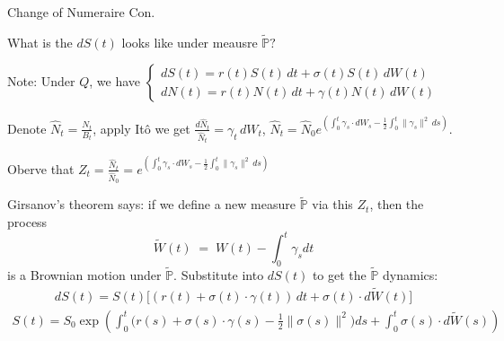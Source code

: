 \documentclass{beamer}
\begin{document}
\begin{frame}{Change of Numeraire Con.}

    {\footnotesize \footnotesize
    \par What is the $dS(t)$ looks like under meausre $\tilde{\mathbb{P}}?$
    \par Note: Under $Q$, we have $\begin{cases}
        dS(t) = r(t) S(t) \,dt + \sigma(t) S(t) \,dW(t)\\dN(t) = r(t) N(t) \,dt + \gamma(t) N(t) \,dW(t)
    \end{cases}$
    \par Denote $\widehat N_t = \frac{N_t}{B_t}$, apply Itô we get
     $\frac{d\widehat N_t}{\widehat N_t}=\gamma_t\,dW_t$, $\widehat N_t
    = \widehat N_0 e^{\left(
      \int_0^t \gamma_s \cdot dW_s
      - \frac{1}{2} \int_0^t \|\gamma_s\|^2 \, ds
    \right)}.$
    \par Oberve that $Z_t  = \frac{\widehat N_t}{\widehat N_0} = e^{\left(
      \int_0^t \gamma_s \cdot dW_s
      - \frac{1}{2} \int_0^t \|\gamma_s\|^2 \, ds
    \right)}$\pause
    \par Girsanov's theorem says: if we define a new measure $\tilde{\mathbb{P}}$ via this $Z_t$, then the process
            \[
        \tilde{W}(t) \;=\; W(t) - \int_{0}^{t}\gamma_sdt
            \]
        is a Brownian motion under $\tilde{\mathbb{P}}$. Substitute into $dS(t)$ to get the $\tilde{\mathbb{P}}$ dynamics:
        \begin{align*}
            dS(t) = S(t)\Big[ (r(t) + \sigma(t) \cdot \gamma(t))\,dt + \sigma(t)  \cdot d\tilde{W}(t) \Big]
        \end{align*}
        \begin{align*}
            S(t)
           = S_0 \exp\!\left(
            \int_0^t \!\Big(r(s) + \sigma(s) \!\cdot\!\gamma(s) - \tfrac12 \|\sigma(s)\|^2\Big) ds
            + \int_0^t \!\sigma(s) \!\cdot\! d\tilde{W}(s)\right)
        \end{align*}
    }
    
\end{frame}
\end{document}
